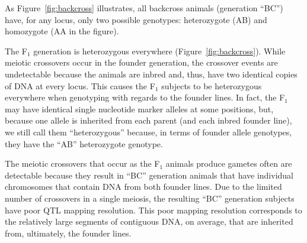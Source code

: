 \documentclass[]{article}\usepackage[]{graphicx}\usepackage[]{color}
\begin{document}
As Figure~\ref{fig:backcross} illustrates, all backcross animals (generation ``BC'') have, for any locus, only two possible genotypes: heterozygote (AB) and homozygote (AA in the figure). 

The F$_1$ generation is heterozygous everywhere (Figure~\ref{fig:backcross}).
While meiotic crossovers occur in the founder generation, the crossover events are
undetectable because the animals are inbred and, thus, have two identical copies
of DNA at every locus. This causes the F$_1$ subjects to be heterozygous everywhere
when genotyping with regards to the founder lines.
In fact, the F$_1$ may have identical single nucleotide marker alleles at some
positions, but, because one allele is inherited from each parent (and each inbred
founder line), we still call them ``heterozygous'' because, in terms of founder allele genotypes, they have the ``AB'' heterozygote genotype.

The meiotic crossovers that occur as the F$_1$ animals produce gametes often
are detectable because they result in ``BC'' generation animals that have individual
chromosomes that contain DNA from both founder lines. Due to the limited number
of crossovers in a single meiosis, the resulting ``BC'' generation subjects have
poor QTL mapping resolution. This poor mapping resolution corresponds to the relatively large segments of contiguous DNA, on average, that are inherited from, ultimately, the founder lines.
\end{document}
